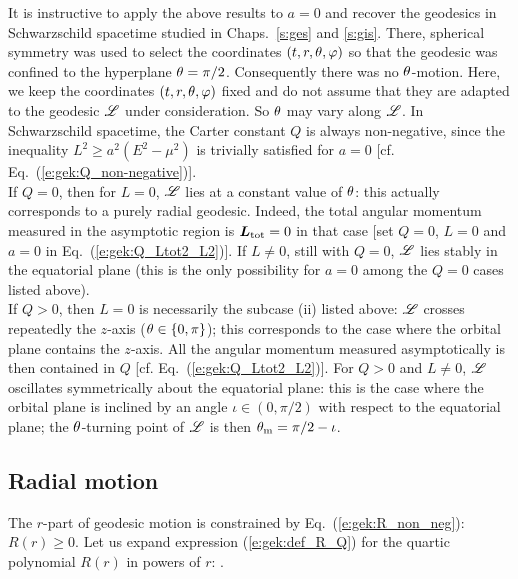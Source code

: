 \begin{example}
It is instructive to apply the above results to $a=0$ and recover
the geodesics in Schwarzschild spacetime studied in Chaps.~\ref{s:ges} and \ref{s:gis}.
There, spherical symmetry was used to select the coordinates $(t,r,\theta,\varphi)$ so that
the geodesic was confined to the hyperplane $\theta=\pi/2$. Consequently there was
no $\theta$-motion. Here, we keep the coordinates $(t,r,\theta,\varphi)$ fixed and do not
assume that they are adapted to the geodesic $\mathscr{L}$ under consideration. So $\theta$
may vary along $\mathscr{L}$. In Schwarzschild spacetime, the Carter constant $Q$
is always non-negative, since the inequality $L^2 \geq a^2(E^2-\mu^2)$ is
trivially satisfied for $a=0$ [cf. Eq.~(\ref{e:gek:Q_non-negative})].\\
If $Q=0$, then for $L=0$, $\mathscr{L}$ lies at a constant value of $\theta$: this actually
corresponds to a purely radial geodesic. Indeed,
the total angular momentum measured in the asymptotic region is $\bm{L}_{\rm tot} = 0$
in that case [set $Q=0$, $L=0$ and $a=0$ in Eq.~(\ref{e:gek:Q_Ltot2_L2})].
If $L\neq 0$, still with $Q=0$,
$\mathscr{L}$ lies stably in the equatorial plane (this is the only possibility for $a=0$ among
the $Q=0$ cases listed above).\\
If $Q>0$, then $L=0$ is necessarily the subcase (ii) listed above:
$\mathscr{L}$ crosses repeatedly the $z$-axis ($\theta\in\{0,\pi\}$); this corresponds to the case where
the orbital plane contains the $z$-axis. All the angular momentum measured asymptotically
is then contained in $Q$ [cf. Eq.~(\ref{e:gek:Q_Ltot2_L2})].
For $Q>0$ and $L\neq 0$, $\mathscr{L}$ oscillates symmetrically about the equatorial
plane: this is the case where the orbital plane is inclined by an angle
$\iota\in(0,\pi/2)$
with respect to the equatorial plane; the $\theta$-turning point of $\mathscr{L}$ is then
$\theta_{\rm m} = \pi/2-\iota$.
\end{example}


\subsection{Radial motion} \label{s:gek:r-motion}

The $r$-part of geodesic motion is constrained by Eq.~(\ref{e:gek:R_non_neg}):
$R(r) \geq 0$. Let us expand expression (\ref{e:gek:def_R_Q})
for the quartic polynomial $R(r)$ in powers of $r$:
\be \label{e:gek:R_r_powers}
     .
\ee

